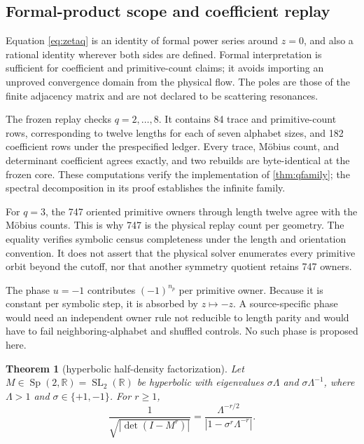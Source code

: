 \documentclass[11pt,a4paper]{article}
\newtheorem{theorem}{Theorem}[section]
\theoremstyle{definition}
\theoremstyle{remark}
\newcommand{\SL}{\operatorname{SL}}
\begin{document}
\subsection{Formal-product scope and coefficient replay}

Equation \eqref{eq:zetaq} is an identity of formal power series around \(z=0\), and also a rational identity wherever both sides are defined. Formal interpretation is sufficient for coefficient and primitive-count claims; it avoids importing an unproved convergence domain from the physical flow. The poles are those of the finite adjacency matrix and are not declared to be scattering resonances.

The frozen replay checks \(q=2,\ldots,8\). It contains 84 trace and primitive-count rows, corresponding to twelve lengths for each of seven alphabet sizes, and 182 coefficient rows under the prespecified ledger. Every trace, Möbius count, and determinant coefficient agrees exactly, and two rebuilds are byte-identical at the frozen core. These computations verify the implementation of \cref{thm:qfamily}; the spectral decomposition in its proof establishes the infinite family.

For \(q=3\), the 747 oriented primitive owners through length twelve agree with the Möbius counts. This is why 747 is the physical replay count per geometry. The equality verifies symbolic census completeness under the length and orientation convention. It does not assert that the physical solver enumerates every primitive orbit beyond the cutoff, nor that another symmetry quotient retains 747 owners.

The phase \(u=-1\) contributes \((-1)^{n_p}\) per primitive owner. Because it is constant per symbolic step, it is absorbed by \(z\mapsto-z\). A source-specific phase would need an independent owner rule not reducible to length parity and would have to fail neighboring-alphabet and shuffled controls. No such phase is proposed here.

\begin{theorem}[hyperbolic half-density factorization]\label{thm:half}
Let \(M\in\operatorname{Sp}(2,\mathbb R)=\SL_2(\mathbb R)\) be hyperbolic with eigenvalues \(\sigma\Lambda\) and \(\sigma\Lambda^{-1}\), where \(\Lambda>1\) and \(\sigma\in\{+1,-1\}\). For \(r\ge1\),
\begin{equation}\label{eq:half}
 \frac{1}{\sqrt{|\det(I-M^r)|}}
 =\frac{\Lambda^{-r/2}}{|1-\sigma^r\Lambda^{-r}|}.
\end{equation}
\end{theorem}
\end{document}
